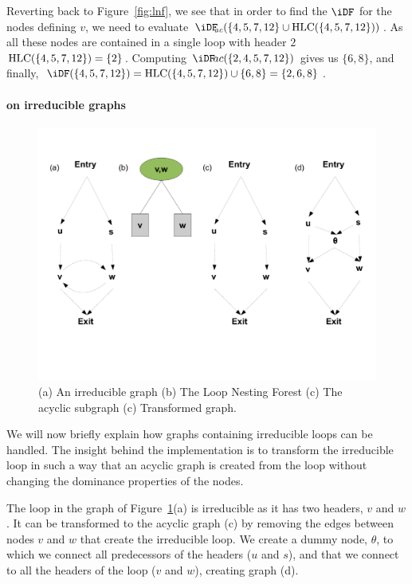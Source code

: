 {{Reverting back 
to Figure~\ref{fig:lnf}, we see that in order to find the $\iDF$ for the nodes 
defining $v$, we need to evaluate $\iDFac(\{4,5,7,12\} \cup 
\HLC(\{4,5,7,12\}))$. As all these nodes are contained in a single loop with 
header $2$ $\mbox{HLC}(\{4,5,7,12\}) = \{2\}$.
Computing $\iDF\!ac(\{2,4,5,7,12\})$ gives us $\{6,8\}$, and finally, 
$\iDF(\{4,5,7,12\}) = \HLC(\{4,5,7,12\}) \cup \{6,8\} = \{2,6,8\}$.  
}

\paragraph{\iDF on irreducible graphs}

\begin{figure}[t]
  \centerline{\includegraphics[scale=0.3]{irred.pdf}}
  \caption{(a) An irreducible graph (b) The Loop Nesting Forest (c) The acyclic subgraph (c) Transformed
  graph.}
  \label{fig:irred}
\end{figure} 



We will now briefly explain how graphs containing irreducible loops can be 
handled. The insight behind the implementation is to transform the irreducible 
loop in such a way that an acyclic graph is created from the loop without 
changing the dominance properties of the nodes.

The loop in the graph of Figure~\ref{fig:irred}(a) is irreducible as it has two 
headers, $v$ and $w$.
It can be transformed to the acyclic graph (c) by removing 
the edges between nodes $v$ and $w$ that create the irreducible loop.
We create a dummy node, $\theta$, to which we connect all predecessors of the 
headers ($u$ and $s$), and that we connect to all the headers of the loop 
($v$ and $w$), creating graph (d).

}
